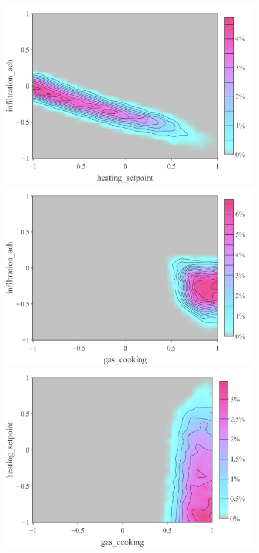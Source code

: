 \documentclass[a4paper, 12pt]{article}
\begin{document}
\begin{figure}
\centering
 \includegraphics[width=\scale]{Gas_Compatibility/Opt_Depth/Depth_MD=10_x=1_y=6}
 \includegraphics[width=\scale]{Gas_Compatibility/Opt_Depth/Depth_MD=10_x=8_y=6}\\
 \hspace{\scale}
  \includegraphics[width=\scale]{Gas_Compatibility/Opt_Depth/Depth_MD=10_x=8_y=1}
 \caption{}
 \label{Fig_Opt_Depth_10MD}
\end{figure}
\end{document}
